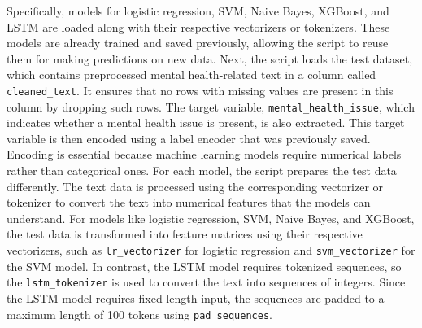 \noindent
Specifically, models for logistic regression, SVM, Naive Bayes, XGBoost, and LSTM are loaded along with their respective vectorizers or tokenizers. These models are already trained and saved previously, allowing the script to reuse them for making predictions on new data. Next, the script loads the test dataset, which contains preprocessed mental health-related text in a column called \texttt{cleaned\_text}. It ensures that no rows with missing values are present in this column by dropping such rows. The target variable, \texttt{mental\_health\_issue}, which indicates whether a mental health issue is present, is also extracted. This target variable is then encoded using a label encoder that was previously saved. Encoding is essential because machine learning models require numerical labels rather than categorical ones. For each model, the script prepares the test data differently. The text data is processed using the corresponding vectorizer or tokenizer to convert the text into numerical features that the models can understand. For models like logistic regression, SVM, Naive Bayes, and XGBoost, the test data is transformed into feature matrices using their respective vectorizers, such as \texttt{lr\_vectorizer} for logistic regression and \texttt{svm\_vectorizer} for the SVM model. In contrast, the LSTM model requires tokenized sequences, so the \texttt{lstm\_tokenizer} is used to convert the text into sequences of integers. Since the LSTM model requires fixed-length input, the sequences are padded to a maximum length of 100 tokens using \texttt{pad\_sequences}.

\vspace{1em}

